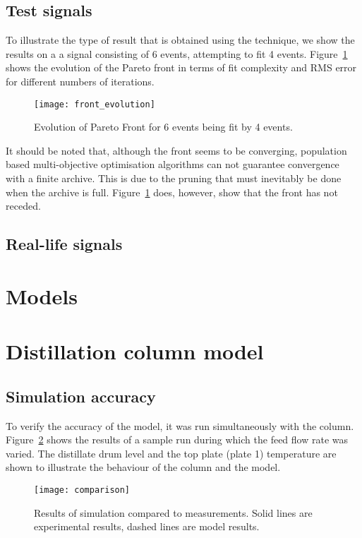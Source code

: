 \subsection{Test signals}
To illustrate the type of result that is obtained using the technique,
we show the results on a a signal consisting of 6 events, attempting
to fit 4 events.  Figure~\ref{fig:front_evolution} shows the evolution
of the Pareto front in terms of fit complexity and RMS error for
different numbers of iterations.

\begin{figure}[htbp]
  \centering
  \texttt{[image: front\_evolution]}
  \caption{Evolution of Pareto Front for 6 events being fit by 4 events.}
  \label{fig:front_evolution}
\end{figure}

It should be noted that, although the front seems to be converging,
population based multi-objective optimisation algorithms can not
guarantee convergence with a finite archive.  This is due to the
pruning that must inevitably be done when the archive is full.
Figure~\ref{fig:front_evolution} does, however, show that the front has not
receded.

\subsection{Real-life signals}


\section{Models}

\section{Distillation column model}
\subsection{Simulation accuracy}
To verify the accuracy of the model, it was run simultaneously with
the column.  Figure~\ref{fig:comparison} shows the results of a sample
run during which the feed flow rate was varied.  The distillate drum
level and the top plate (plate 1) temperature are shown to illustrate
the behaviour of the column and the model.

\label{sec:results}
\begin{figure}[htbp]
  \centering
  \texttt{[image: comparison]}
  \caption{Results of simulation compared to measurements.  Solid
    lines are experimental results, dashed lines are model results.}
  \label{fig:comparison}
\end{figure}

